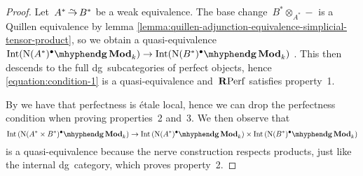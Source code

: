 \begin{refsection}
\begin{theorem}
\begin{proof}[Proof]
    Let~$A^*\weq B^*$ be a weak equivalence. The base change~$B^*\otimes_{A^*}-$ is a Quillen equivalence by lemma \ref{lemma:quillen-adjunction-equivalence-simplicial-tensor-product}, so we obtain a quasi-equivalence~$\Int({\nerve(A^*)^\bullet}\mhyphen\dgMod_k)\to\Int({\nerve(B^*)^\bullet}\mhyphen\dgMod_k)$ \cite[proposition 3.2]{toen}. This then descends to the full dg~subcategories of perfect objects, hence \eqref{equation:condition-1} is a quasi-equivalence and~$\mathbf{R}\mathrm{Perf}$ satisfies property~1.

    By \cite[corollary 1.3.7.4]{hagII} we have that perfectness is \'etale local, hence we can drop the perfectness condition when proving properties~2 and~3. We then observe that
    \begin{equation}
      \Int\left( {\nerve(A^*\times B^*)^\bullet}\mhyphen\dgMod_k \right)\to\Int\left( {\nerve(A^*)^\bullet}\mhyphen\dgMod_k \right)\times\Int\left( {\nerve(B^*)^\bullet}\mhyphen\dgMod_k \right)
    \end{equation}
    is a quasi-equivalence because the nerve construction respects products, just like the internal dg~category, which proves property~2.


\end{proof}
\end{theorem}
\end{refsection}
